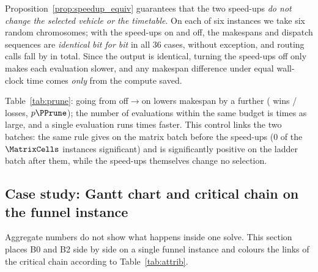 Proposition~\ref{prop:speedup_equiv} guarantees that the two speed-ups \emph{do not change the selected vehicle or the timetable}. On each of six instances we take six random chromosomes; with the speed-ups on and off, the makespans and dispatch sequences are \emph{identical bit for bit} in all $36$ cases, without exception, and routing calls fall by \RouteCallCut{} in total. Since the output is identical, turning the speed-ups off only makes each evaluation slower, and any makespan difference under equal wall-clock time comes \emph{only} from the compute saved.

Table~\ref{tab:prune}: going from off$\to$on lowers makespan by a further \GainPrune{} (\WinPrune{} wins / \LosePrune{} losses, $p\PPrune$); the number of evaluations within the same budget is \EvalRatioPrune{} times as large, and a single evaluation runs \SpeedupProbe{} times faster.
This control links the two batches: the same rule gives \GainProbePre{} on the matrix batch before the speed-ups ($0$ of the $\MatrixCells$ instances significant) and is significantly positive on the ladder batch after them, while the speed-ups themselves change no selection.

\begin{table}[t]
\caption{Changing only pruning and winner-path reuse. ``Off''/``on'' indicates whether the two are enabled; the bold header marks the setting adopted in this paper.
The two settings produce bit-identical output (verified by the equivalence self-check), so the difference comes only from the compute saved. Same instances, same seeds, same wall-clock time; $n=60$ pairs, two-sided Wilcoxon signed-rank test ($^{***}p<0.001$); the aggregate row lists wins/losses/ties and $p$.
Both ratio columns use the \emph{off} value as denominator, in opposite directions: evaluations as on/off, time per evaluation as off/on.}
\label{tab:prune}
\small

\end{table}
\subsection{Case study: Gantt chart and critical chain on the funnel instance}
\label{sec:casestudy}

Aggregate numbers do not show what happens inside one solve. This section places B0 and B2 side by side on a single funnel instance and colours the links of the critical chain according to Table~\ref{tab:attrib}.

